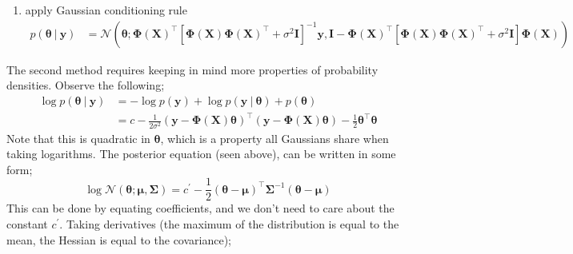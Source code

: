 \documentclass[a4paper, 12pt]{article}
\newcommand{\mat}[1]{\boldsymbol{#1}}
\renewcommand{\vec}[1]{\boldsymbol{#1}}
\begin{document}
\begin{enumerate}
\begin{enumerate}
                    \end{enumerate}
                \item apply Gaussian conditioning rule
                    \begin{align*}
                        p(\vec{\theta}\ |\ \vec{y}) & = \mathcal{N}(\vec{\theta}; \mat{\Phi}(\mat{X})^\top[\mat{\Phi}(\mat{X})\mat{\Phi}(\mat{X})^\top + \sigma^2\mat{I}]^{-1}\vec{y}, \mat{I} - \mat{\Phi}(\mat{X})^\top[\mat{\Phi}(\mat{X})\mat{\Phi}(\mat{X})^\top + \sigma^2\mat{I}]\mat{\Phi}(\mat{X}))
                    \end{align*}
            \end{enumerate}
            The second method requires keeping in mind more properties of probability densities.
            Observe the following;
            \begin{align*}
                \log p(\vec{\theta}\ |\ \vec{y}) & = -\log p(\vec{y}) + \log p(\vec{y}\ |\ \vec{\theta}) + p(\vec{\theta}) \\
                & = c - \frac{1}{2\sigma^2}(\vec{y} - \mat{\Phi}(\mat{X})\vec{\theta})^\top(\vec{y} - \mat{\Phi}(\mat{X})\vec{\theta}) - \frac{1}{2} \vec{\theta}^\top\vec{\theta}
            \end{align*}
            Note that this is quadratic in $\mat{\theta}$, which is a property all Gaussians share when taking logarithms.
            The posterior equation (seen above), can be written in some form;
            $$\log \mathcal{N}(\vec{\theta}; \vec{\mu}, \mat{\Sigma}) = c^\prime - \frac{1}{2}(\vec{\theta} - \vec{\mu})^\top\mat{\Sigma}^{-1}(\vec{\theta} - \vec{\mu})$$
            This can be done by equating coefficients, and we don't need to care about the constant $c^\prime$.
            Taking derivatives (the maximum of the distribution is equal to the mean, the Hessian is equal to the covariance);
\end{document}

